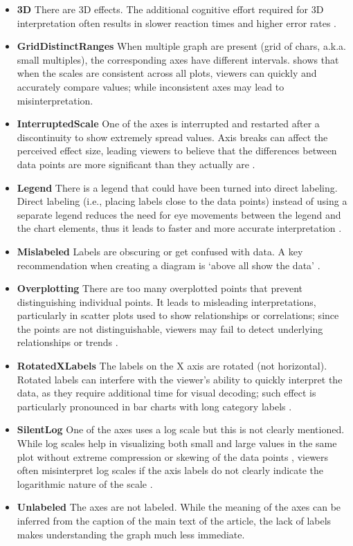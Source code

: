 \documentclass[
  10pt,
  conference,
]{IEEEtran}%
\begin{document}
\begin{itemize}
\item
  \textbf{3D} There are 3D effects. The additional cognitive effort
  required for 3D interpretation often results in slower reaction times
  and higher error rates .
\item
  \textbf{GridDistinctRanges} When multiple graph are present (grid of
  chars, a.k.a. small multiples), the corresponding axes have different
  intervals.  shows that when the scales
  are consistent across all plots, viewers can quickly and accurately
  compare values; while inconsistent axes may lead to misinterpretation.
\item
  \textbf{InterruptedScale} One of the axes is interrupted and restarted
  after a discontinuity to show extremely spread values. Axis breaks can
  affect the perceived effect size, leading viewers to believe that the
  differences between data points are more significant than they
  actually are .
\item
  \textbf{Legend} There is a legend that could have been turned into
  direct labeling. Direct labeling (i.e., placing labels close to the
  data points) instead of using a separate legend reduces the need for
  eye movements between the legend and the chart elements, thus it leads
  to faster and more accurate interpretation
  .
\item
  \textbf{Mislabeled} Labels are obscuring or get confused with data. A
  key recommendation when creating a diagram is `above all show the
  data' .
\item
  \textbf{Overplotting} There are too many overplotted points that
  prevent distinguishing individual points. It leads to misleading
  interpretations, particularly in scatter plots used to show
  relationships or correlations; since the points are not
  distinguishable, viewers may fail to detect underlying relationships
  or trends .
\item
  \textbf{RotatedXLabels} The labels on the X axis are rotated (not
  horizontal). Rotated labels can interfere with the viewer's ability to
  quickly interpret the data, as they require additional time for visual
  decoding; such effect is particularly pronounced in bar charts with
  long category labels .
\item
  \textbf{SilentLog} One of the axes uses a log scale but this is not
  clearly mentioned. While log scales help in visualizing both small and
  large values in the same plot without extreme compression or skewing
  of the data points , viewers
  often misinterpret log scales if the axis labels do not clearly
  indicate the logarithmic nature of the scale
  .
\item
  \textbf{Unlabeled} The axes are not labeled. While the meaning of the
  axes can be inferred from the caption of the main text of the article,
  the lack of labels makes understanding the graph much less immediate.
\end{itemize}
\end{document}
